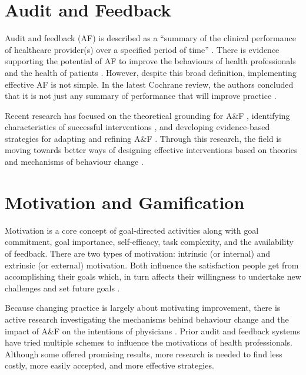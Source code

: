\section{Audit and Feedback} %
Audit and feedback (\gls{AF}) is described as a ``summary of the clinical performance of healthcare provider(s) over a specified period of time'' \cite{ivers2012audit}. There is evidence supporting the potential of  \gls{AF} to improve the behaviours of health professionals  and the health of patients \cite{ivers2012audit}. However, despite this broad definition, implementing effective \gls{AF} is not simple. In the latest Cochrane review, the authors concluded that it is not just any summary of performance that will improve practice \cite{ivers2012audit}.

Recent research has focused on the theoretical grounding for A\&F
\cite{hysong2017theory, brown2019clinical, landis2015computer}, identifying characteristics of successful interventions \cite{ivers2012audit, colquhoun2013systematic, tuti2017systematic}, and developing evidence-based strategies for adapting and refining A\&F \cite{brehaut2016practice, mcnamara2016confidential}. Through this research, the field is moving towards better ways of designing effective interventions based on theories and mechanisms of behaviour change \cite{colquhoun2017advancing}.

\section{Motivation and Gamification}
Motivation is a core concept of goal-directed activities along with goal commitment, goal importance, self-efficacy, task complexity, and the availability of feedback. There are two types of motivation: intrinsic (or internal) and extrinsic (or external) motivation. Both influence the satisfaction people get from accomplishing their goals which, in turn affects their willingness to undertake new challenges and set future goals  \cite{locke2002building}.

Because changing practice is largely about motivating improvement, there is active research investigating the mechanisms behind behaviour change \cite{michie2011behaviour} and the impact of A\&F on the intentions of physicians \cite{gude2018health}. Prior audit and feedback systems have tried multiple schemes to influence the motivations of health professionals. Although some offered promising results, more research is needed to find less costly, more easily accepted, and more effective strategies.

